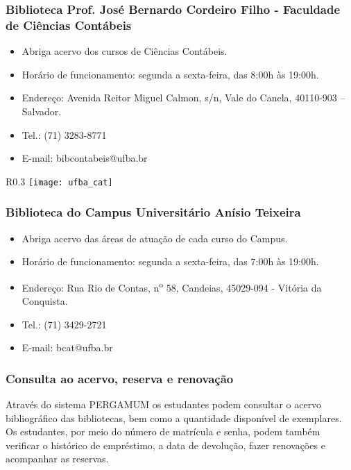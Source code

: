     \subsubsection{Biblioteca Prof. José Bernardo Cordeiro Filho - Faculdade de Ciências Contábeis}
        \begin{itemize}
            \item Abriga acervo dos cursos de Ciências Contábeis.
            \item Horário de funcionamento: segunda a sexta-feira, das 8:00h às 19:00h.
            \item Endereço: Avenida Reitor Miguel Calmon, s/n, Vale do Canela, 40110-903 – Salvador.
            \item Tel.: (71) 3283-8771
            \item E-mail: bibcontabeis@ufba.br
        \end{itemize}
        \begin{wrapfigure}{R}{0.3\textwidth}
            \centering
            \texttt{[image: ufba\_cat]}
        \end{wrapfigure}
    \subsubsection{Biblioteca do Campus Universitário Anísio Teixeira}
        \begin{itemize}
            \item Abriga acervo das áreas de atuação de cada curso do Campus.
            \item Horário de funcionamento: segunda a sexta-feira, das 7:00h às 19:00h.
            \item Endereço: Rua Rio de Contas, n\textsuperscript{o} 58, Candeias, 45029-094 - Vitória da Conquista.
            \item Tel.: (71) 3429-2721
            \item E-mail: bcat@ufba.br
        \end{itemize}
    \subsubsection{Consulta ao acervo, reserva e renovação}
        Através do sistema PERGAMUM os estudantes podem consultar o acervo bibliográfico das bibliotecas, bem como a quantidade disponível de exemplares. Os estudantes, por meio do número de matrícula e senha, podem também verificar o histórico de empréstimo, a data de devolução, fazer renovações e acompanhar as reservas.
        
